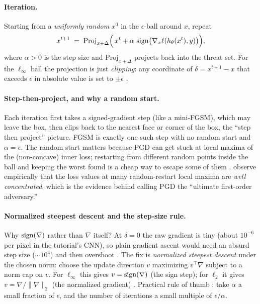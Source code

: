 \paragraph{Iteration.} Starting from a \emph{uniformly random} $x^0$ in the $\epsilon$-ball around $x$, repeat
\begin{equation}
  \label{eq:pgd}
  x^{t+1} \;=\; \mathrm{Proj}_{x+\Delta}\Big(\,x^t + \alpha\,\operatorname{sign}\!\big(\nabla_x \ell(h_\theta(x^t),y)\big)\Big),
\end{equation}
where $\alpha>0$ is the step size and $\mathrm{Proj}_{x+\Delta}$ projects back into the threat set. For the $\ell_\infty$ ball the projection is just \emph{clipping}: any coordinate of $\delta=x^{t+1}-x$ that exceeds $\epsilon$ in absolute value is set to $\pm\epsilon$ \citep{kolter2018adversarial}.

\paragraph{Step-then-project, and why a random start.} Each iteration first takes a signed-gradient step (like a mini-FGSM), which may leave the box, then clips back to the nearest face or corner of the box, the ``step then project'' picture. FGSM is exactly one such step with no random start and $\alpha=\epsilon$. The random start matters because PGD can get stuck at local maxima of the (non-concave) inner loss; restarting from different random points inside the ball and keeping the worst found is a cheap way to escape some of them \citep{kolter2018adversarial}. \citet{madry2018towards} observe empirically that the loss values at many random-restart local maxima are \emph{well concentrated}, which is the evidence behind calling PGD the ``ultimate first-order adversary.''

\paragraph{Normalized steepest descent and the step-size rule.} Why $\operatorname{sign}(\nabla)$ rather than $\nabla$ itself? At $\delta=0$ the raw gradient is tiny (about $10^{-6}$ per pixel in the tutorial's CNN), so plain gradient ascent would need an absurd step size ($\sim10^4$) and then overshoot \citep{kolter2018adversarial}. The fix is \emph{normalized steepest descent} under the chosen norm: choose the update direction $v$ maximizing $v^\top\nabla$ subject to a norm cap on $v$. For $\ell_\infty$ this gives $v=\operatorname{sign}(\nabla)$ (the sign step); for $\ell_2$ it gives $v=\nabla/\|\nabla\|_2$ (the normalized gradient) \citep{kolter2018adversarial}. Practical rule of thumb \citep{kolter2018adversarial}: take $\alpha$ a small fraction of $\epsilon$, and the number of iterations a small multiple of $\epsilon/\alpha$.

